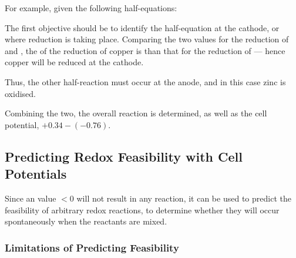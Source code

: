 			For example, given the following half-equations:


			The first objective should be to identify the half-equation at the cathode, or where reduction is taking place. Comparing the two \Eo{}
			values for the reduction of  and , the \Eo{} of the reduction of copper is  than that for
			the reduction of  --- hence copper will be reduced at the cathode.

			Thus, the other half-reaction must occur at the anode, and in this case zinc is oxidised.

			Combining the two, the overall reaction is determined, as well as the cell potential, $+0.34 - (-0.76)$.



		\subsection{Predicting Redox Feasibility with Cell Potentials}

			Since an \Ecell{} value $ < 0$ will not result in any reaction, it can be used to predict the feasibility of arbitrary redox
			reactions, to determine whether they will occur spontaneously when the reactants are mixed.

			\subsubsection{Limitations of Predicting Feasibility}

